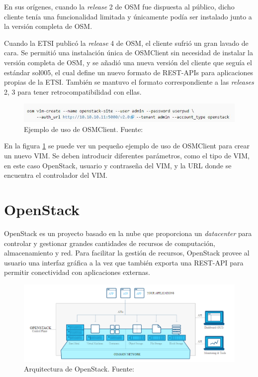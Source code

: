 En sus orígenes, cuando la \textit{release} 2 de \ac{OSM} fue dispuesta al público, dicho cliente tenía una funcionalidad limitada y únicamente podía ser instalado junto a la versión completa de \ac{OSM}.

Cuando la \ac{ETSI} publicó la \textit{release} 4 de \ac{OSM}, el cliente sufrió un gran lavado de cara. Se permitió una instalación única de OSMClient sin necesidad de instalar la versión completa de \ac{OSM}, y se añadió una nueva versión del cliente que seguía el estándar sol005\cite{sol005item}, el cual define un nuevo formato de REST-\acp{API} para aplicaciones propias de la \ac{ETSI}. También se mantuvo el formato correspondiente a las \textit{releases} 2, 3 para tener retrocompatibilidad con ellas.

\begin{figure}[!ht]
	\centering
	\includegraphics[width=0.9\linewidth]{imagenes/osmclientpython_example}
	\caption{Ejemplo de uso de OSMClient. Fuente:\cite{osmrel5bib}}
	\label{fig:osmclientpythonexample}
\end{figure}

En la figura \ref{fig:osmclientpythonexample} se puede ver un pequeño ejemplo de uso de OSMClient para crear un nuevo \ac{VIM}. Se deben introducir diferentes parámetros, como el tipo de \ac{VIM}, en este caso OpenStack, usuario y contraseña del \ac{VIM}, y la \ac{URL} donde se encuentra el controlador del \ac{VIM}.

\section{OpenStack}
\label{sec:openstack}

OpenStack\cite{openstackbib} es un proyecto basado en la nube que proporciona un \textit{datacenter} para controlar y gestionar grandes cantidades de recursos de computación, almacenamiento y red. Para facilitar la gestión de recursos, OpenStack provee al usuario una interfaz gráfica a la vez que también exporta una REST-\ac{API} para permitir conectividad con aplicaciones externas.

\begin{figure}[!ht]
	\centering
	\includegraphics[width=0.9\linewidth]{imagenes/openstack_arch}
	\caption{Arquitectura de OpenStack. Fuente:\cite{openstackbib}}
	\label{fig:openstackarch}
\end{figure}

